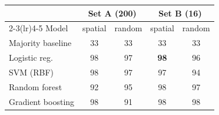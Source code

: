 \begin{tabular}{lcccc}
\toprule
 & \multicolumn{2}{c}{Set A (200)} & \multicolumn{2}{c}{Set B (16)} \\
\cmidrule(lr){2-3}\cmidrule(lr){4-5}
Model & spatial & random & spatial & random \\
\midrule
Majority baseline & 33 & 33 & 33 & 33 \\
Logistic reg. & 98 & 97 & \textbf{98} & 96 \\
SVM (RBF) & 98 & 97 & 97 & 94 \\
Random forest & 92 & 95 & 98 & 97 \\
Gradient boosting & 98 & 91 & 98 & 98 \\
\bottomrule
\end{tabular}

